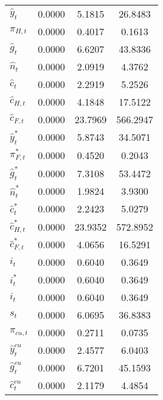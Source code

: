 \begin{center}
\begin{longtable}{lccc}
${\hat y_t}               $	 & 	       0.0000	 & 	       5.1815	 & 	      26.8483 \\ 
${\pi_{H,t}}              $	 & 	       0.0000	 & 	       0.4017	 & 	       0.1613 \\ 
${\hat g_t}               $	 & 	       0.0000	 & 	       6.6207	 & 	      43.8336 \\ 
${\hat n_t}               $	 & 	       0.0000	 & 	       2.0919	 & 	       4.3762 \\ 
${\hat c_t}               $	 & 	       0.0000	 & 	       2.2919	 & 	       5.2526 \\ 
${\hat c_{H,t}}           $	 & 	       0.0000	 & 	       4.1848	 & 	      17.5122 \\ 
${\hat c_{F,t}}           $	 & 	       0.0000	 & 	      23.7969	 & 	     566.2947 \\ 
${\hat y_t^*}             $	 & 	       0.0000	 & 	       5.8743	 & 	      34.5071 \\ 
${\pi_{F,t}^*}            $	 & 	       0.0000	 & 	       0.4520	 & 	       0.2043 \\ 
${\hat g_t^*}             $	 & 	       0.0000	 & 	       7.3108	 & 	      53.4472 \\ 
${\hat n_t^*}             $	 & 	       0.0000	 & 	       1.9824	 & 	       3.9300 \\ 
${\hat c_t^*}             $	 & 	       0.0000	 & 	       2.2423	 & 	       5.0279 \\ 
${\hat c_{H,t}^*}         $	 & 	       0.0000	 & 	      23.9352	 & 	     572.8952 \\ 
${\hat c_{F,t}^*}         $	 & 	       0.0000	 & 	       4.0656	 & 	      16.5291 \\ 
${i_t}                    $	 & 	       0.0000	 & 	       0.6040	 & 	       0.3649 \\ 
${i_t^*}                  $	 & 	       0.0000	 & 	       0.6040	 & 	       0.3649 \\ 
${i_t}                    $	 & 	       0.0000	 & 	       0.6040	 & 	       0.3649 \\ 
${s_t}                    $	 & 	       0.0000	 & 	       6.0695	 & 	      36.8383 \\ 
${\pi_{cu,t}}             $	 & 	       0.0000	 & 	       0.2711	 & 	       0.0735 \\ 
${\hat y_t^{cu}}          $	 & 	       0.0000	 & 	       2.4577	 & 	       6.0403 \\ 
${\hat g_t^{cu}}          $	 & 	       0.0000	 & 	       6.7201	 & 	      45.1593 \\ 
${\hat c_t^{cu}}          $	 & 	       0.0000	 & 	       2.1179	 & 	       4.4854 \\ 
\end{longtable}
 \end{center}
